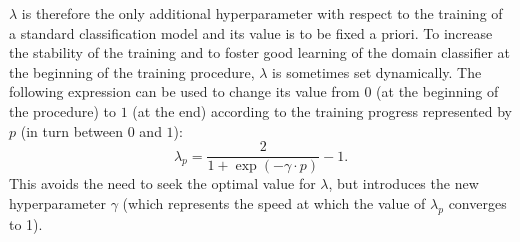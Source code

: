 \documentclass[%
    corpo=12pt,
    twoside,
    stile=classica,   
    tipotesi=magistrale,
    evenboxes,
    english,
	numerazioneromana,
]{toptesi}
\begin{document}
$\lambda$ is therefore the only additional hyperparameter with respect to the training of a standard classification model and its value is to be fixed a priori. To increase the stability of the training and to foster good learning of the domain classifier at the beginning of the training procedure, $\lambda$ is sometimes set dynamically. The following expression can be used to change its value from $0$ (at the beginning of the procedure) to $1$ (at the end) according to the training progress represented by $p$ (in turn between $0$ and $1$):
\begin{equation}
	\lambda_p = \frac{2}{1 + \exp{\left(-\gamma\cdot p\right)}} - 1.
\end{equation}
This avoids the need to seek the optimal value for $\lambda$, but introduces the new hyperparameter $\gamma$ (which represents the speed at which the value of $\lambda_p$ converges to 1).
\end{document}
